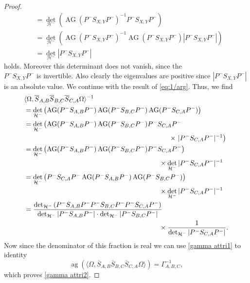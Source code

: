 \documentclass[b5paper,draft,openbib,12pt]{memoir}
\DeclareMathOperator{\ag}{ag}
\DeclareMathOperator{\AG}{AG}
\begin{document}
\begin{proof}
\begin{align}
&=\det_{\mathcal{H}^-} \left(\AG(P^- S_{X,Y}P^-)^{-1} P^- S_{X,Y} P^- \right)\\
&=\det_{\mathcal{H}^-} \left(\AG(P^- S_{X,Y}P^-)^{-1} \AG(P^- S_{X,Y}P^-) |P^- S_{X,Y} P^-| \right)\\
&=\det_{\mathcal{H}^-} |P^- S_{X,Y}P^-|
\end{align}
holds. Moreover this determinant does not vanish, since the\\ \(P^- S_{X,Y}P^-\) is invertible. Also clearly the eigenvalues are positive
since \(|P^- S_{X,Y}P^-|\) is an absolute value. We continue with the result of \eqref{eq:1/arg}. Thus, we find
\begin{align}\label{eq: arg representation}
&\langle \Omega, \overline{S}_{A,B} \overline{S}_{B,C} \overline{S}_{C,A}\Omega\rangle^{-1}\\
&=\det_{\mathcal{H}^-}\left(  \AG(P^- S_{A,B} P^-) \AG(P^- S_{B,C} P^-) \AG(P^-S_{C,A} P^-)  \right)\\\notag
&=\det_{\mathcal{H}^-}\left(  \AG(P^- S_{A,B} P^-) \AG(P^- S_{B,C} P^-) P^-S_{C,A} P^-\right.\\
&\hspace{7.5cm}\times\left. |P^-S_{C,A} P^-|^{-1}  \right)\\\notag
&=\det_{\mathcal{H}^-}\left(  \AG(P^- S_{A,B} P^-) \AG(P^- S_{B,C} P^-) P^-S_{C,A} P^-  \right)\\
&\hspace{7cm}\times \det_{\mathcal{H}^-}|P^-S_{C,A} P^-|^{-1} \\\notag
&=\det_{\mathcal{H}^-}\left( P^-S_{C,A} P^- \AG(P^- S_{A,B} P^-) \AG(P^- S_{B,C} P^-)  \right)\\
&\hspace{7cm}\times \det_{\mathcal{H}^-}|P^-S_{C,A} P^-|^{-1} \\\notag
&=\frac{\det_{\mathcal{H}^-}\left(P^- S_{A,B} P^- P^- S_{B,C} P^- P^-S_{C,A} P^-  \right)}
{\det_{\mathcal{H}^-}|P^- S_{A,B} P^-| \cdot \det_{\mathcal{H}^-}|P^-S_{B,C} P^-|}\\
&\hspace{7cm}\times\frac{1}{\det_{\mathcal{H}^-}|P^-S_{C,A} P^-|}.
\end{align}
Now since the denominator of this fraction is real we can use \eqref{gamma attri1} to identity
\begin{equation}
\ag(\langle \Omega, \overline{S}_{A,B} \overline{S}_{B,C} \overline{S}_{C,A}\Omega\rangle)=\Gamma_{A,B,C}^{-1},
\end{equation}
which proves \eqref{gamma attri2}.


\end{proof}
\end{document}
